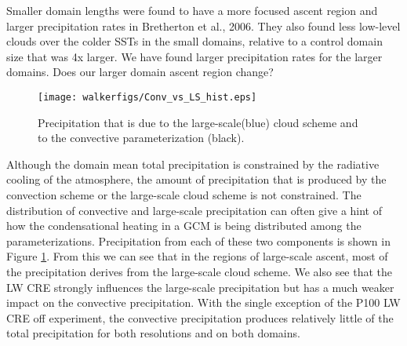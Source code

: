 \documentclass[11pt]{article}   	%
\begin{document}
Smaller domain lengths were found to have a more focused ascent region and larger precipitation rates in Bretherton et al., 2006.
They also found less low-level clouds over the colder SSTs in the small domains, relative to a control domain size that was 4x
larger.   We have found larger precipitation rates for the larger domains.  Does our larger domain ascent region change?  

\begin{figure}
  \centering
      \texttt{[image: walkerfigs/Conv\_vs\_LS\_hist.eps]}
  \caption{Precipitation that is due to the large-scale(blue) cloud scheme and to the convective parameterization (black).}
  \label{fig:conv_vs_ls}
\end{figure}

Although the domain mean total precipitation is constrained by the radiative cooling of the atmosphere, the amount of 
precipitation that is produced by the convection scheme or the large-scale cloud scheme is not constrained. 
The distribution of convective and large-scale precipitation can often give a hint of how the condensational heating
in a GCM is being distributed among the parameterizations.  Precipitation from each of these two components is
shown in Figure \ref{fig:conv_vs_ls}.  From this we can see that in the regions of large-scale ascent, most of the 
precipitation derives from the large-scale cloud scheme.  We also see that the LW CRE strongly influences the 
large-scale precipitation but has a much weaker impact on the convective precipitation.  With the single exception 
of the P100 LW CRE off experiment, the convective precipitation
produces relatively little of the total precipitation for both resolutions and on both domains.  
\end{document}
